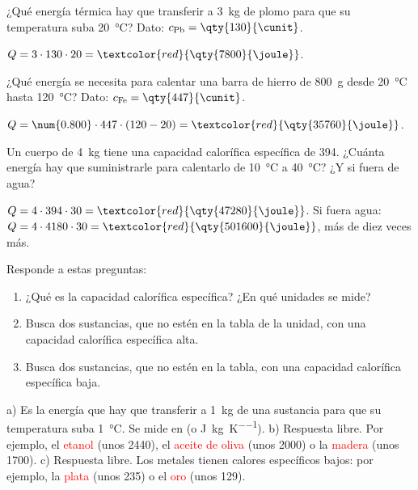 \begin{exercise}
    ¿Qué energía térmica hay que transferir a \qty{3}{\kg} de plomo para que su temperatura suba \qty{20}{\degreeCelsius}? Dato: \(c_{\text{Pb}} = \qty{130}{\cunit}\).
    \begin{solu}
        \(Q = 3 \cdot 130 \cdot 20 = \textcolor{red}{\qty{7800}{\joule}}\).
    \end{solu}
\end{exercise}

\begin{exercise}
    ¿Qué energía se necesita para calentar una barra de hierro de \qty{800}{\gram} desde \qty{20}{\degreeCelsius} hasta \qty{120}{\degreeCelsius}? Dato: \(c_{\text{Fe}} = \qty{447}{\cunit}\).
    \begin{solu}
        \(Q = \num{0.800} \cdot 447 \cdot (120 - 20) = \textcolor{red}{\qty{35760}{\joule}}\).
    \end{solu}
\end{exercise}

\begin{exercise}
    Un cuerpo de \qty{4}{\kg} tiene una capacidad calorífica específica de \qty{394}{\cunit}. ¿Cuánta energía hay que suministrarle para calentarlo de \qty{10}{\degreeCelsius} a \qty{40}{\degreeCelsius}? ¿Y si fuera de agua?
    \begin{solu}
        \(Q = 4 \cdot 394 \cdot 30 = \textcolor{red}{\qty{47280}{\joule}}\). Si fuera agua: \(Q = 4 \cdot 4180 \cdot 30 = \textcolor{red}{\qty{501600}{\joule}}\), más de diez veces más.
    \end{solu}
\end{exercise}

\begin{exercise}
    Responde a estas preguntas:
    \begin{enumerate}[label=\alph*)]
        \item ¿Qué es la capacidad calorífica específica? ¿En qué unidades se mide?
        \item Busca dos sustancias, que no estén en la tabla de la unidad, con una capacidad calorífica específica alta.
        \item Busca dos sustancias, que no estén en la tabla, con una capacidad calorífica específica baja.
    \end{enumerate}
    \begin{solu}
        a) Es la energía que hay que transferir a \qty{1}{\kg} de una sustancia para que su temperatura suba \qty{1}{\degreeCelsius}. Se mide en \textcolor{red}{\unit{\cunit}} (o \unit{\joule\per\kg\per\kelvin}).
        b) Respuesta libre. Por ejemplo, el \textcolor{red}{etanol} (unos \qty{2440}{\cunit}), el \textcolor{red}{aceite de oliva} (unos \qty{2000}{\cunit}) o la \textcolor{red}{madera} (unos \qty{1700}{\cunit}).
        c) Respuesta libre. Los metales tienen calores específicos bajos: por ejemplo, la \textcolor{red}{plata} (unos \qty{235}{\cunit}) o el \textcolor{red}{oro} (unos \qty{129}{\cunit}).
    \end{solu}
\end{exercise}

